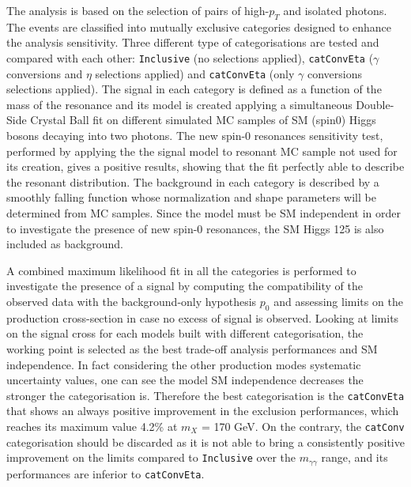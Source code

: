 \documentclass[a4paper, oneside, 11pt, openright]{book}
\begin{document}
		
		
		The analysis is based on the selection of pairs of high-$p_T$ and isolated photons. The events are classified into mutually exclusive categories designed to enhance the analysis sensitivity. Three different type of categorisations are tested and compared with each other: \texttt{Inclusive} (no selections applied), \texttt{catConvEta} ($\gamma$ conversions and $\eta$  selections applied) and \texttt{catConvEta} (only $\gamma$ conversions selections applied). The signal in each category is defined as a function of the mass of the resonance and its model is created applying a simultaneous Double-Side Crystal Ball fit on different simulated MC samples of SM (spin0) Higgs bosons decaying into two photons. The new spin-0 resonances sensitivity test, performed by applying the the signal model to resonant MC sample not used for its creation, gives a positive results, showing that the fit perfectly able to describe the resonant distribution. The background in each category is described by a smoothly falling function whose normalization and shape parameters will be determined from MC samples. Since the model must be SM independent in order to investigate the presence of new spin-0 resonances, the SM Higgs 125 is also included as background. 
		
		A combined maximum likelihood fit in all the categories is performed to investigate the presence of a signal by computing the compatibility of the observed data with the background-only hypothesis $p_0$ \cite{Statistic} and assessing limits \cite{Statistic} on the production cross-section in case no excess of signal is observed. Looking at limits on the signal cross for each models built with different categorisation, the working point is selected as the best trade-off analysis performances and SM independence. In fact considering the other production modes systematic uncertainty values, one can see the model SM independence decreases the stronger the categorisation is. Therefore the best categorisation is the \texttt{catConvEta} that shows an always positive improvement in the exclusion performances, which reaches its maximum value 4.2\% at $m_X$ = 170 GeV. On the contrary, the \texttt{catConv} categorisation should be discarded as it is not able to bring a consistently positive improvement on the limits compared to \texttt{Inclusive} over the $m_{\gamma\gamma}$ range, and its performances are inferior to \texttt{catConvEta}.
		
\end{document}
